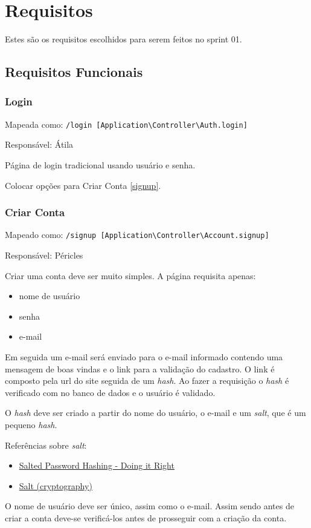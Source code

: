 \section{Requisitos}

Estes são os requisitos escolhidos para serem feitos no sprint 01.

\subsection{Requisitos Funcionais}

\subsubsection{Login}

Mapeada como:
\texttt{/login {[}Application\textbackslash{}Controller\textbackslash{}Auth.login{]}}

Responsável: Átila

Página de login tradicional usando usuário e senha.

Colocar opções para Criar Conta \ref{signup}.

\subsubsection{Criar Conta \label{signup}}

Mapeado como:
\texttt{/signup {[}Application\textbackslash{}Controller\textbackslash{}Account.signup{]}}

Responsável: Péricles

Criar uma conta deve ser muito simples. A página requisita apenas:

\begin{itemize}
\item
  nome de usuário
\item
  senha
\item
  e-mail
\end{itemize}
Em seguida um e-mail será enviado para o e-mail informado contendo uma
mensagem de boas vindas e o link para a validação do cadastro. O link é
composto pela url do site seguida de um \emph{hash}. Ao fazer a
requisição o \emph{hash} é verificado com no banco de dados e o usuário
é validado.

O \emph{hash} deve ser criado a partir do nome do usuário, o e-mail e um
\emph{salt}, que é um pequeno \emph{hash}.

Referências sobre \emph{salt}:

\begin{itemize}
\item
  \href{https://crackstation.net/hashing-security.htm\#salt}{Salted
  Password Hashing - Doing it Right}
\item
  \href{http://en.wikipedia.org/wiki/Salt\_(cryptography)}{Salt
  (cryptography)}
\end{itemize}
O nome de usuário deve ser único, assim como o e-mail. Assim sendo antes
de criar a conta deve-se verificá-los antes de prosseguir com a criação
da conta.

